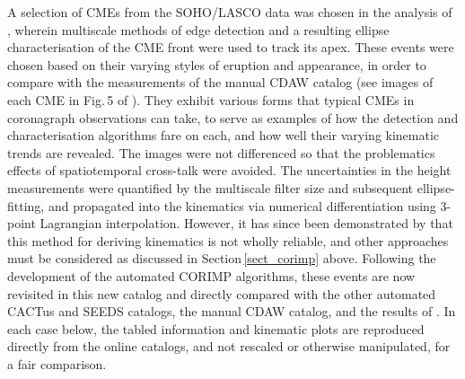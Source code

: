 \documentclass[referee,a4paper,12pt,traditabstract]{swsc}
\begin{document}
A selection of CMEs from the SOHO/LASCO data was chosen in the analysis of \cite{2009A&A...495..325B}, wherein multiscale methods of edge detection and a resulting ellipse characterisation of the CME front were used to track its apex. These events were chosen based on their varying styles of eruption and appearance, in order to compare with the measurements of the manual CDAW catalog (see images of each CME in Fig.\,5 of \citealt{2009A&A...495..325B}). They exhibit various forms that typical CMEs in coronagraph observations can take, to serve as examples of how the detection and characterisation algorithms fare on each, and how well their varying kinematic trends are revealed. The images were not differenced so that the problematics effects of spatiotemporal cross-talk were avoided. The uncertainties in the height measurements were quantified by the multiscale filter size and subsequent ellipse-fitting, and propagated into the kinematics via numerical differentiation using 3-point Lagrangian interpolation. However, it has since been demonstrated by \cite{2013A&A...557A..96B} that this method for deriving kinematics is not wholly reliable, and other approaches must be considered as discussed in Section\,\ref{sect_corimp} above. Following the development of the automated CORIMP algorithms, these events are now revisited in this new catalog and directly compared with the other automated CACTus and SEEDS catalogs, the manual CDAW catalog, and the results of \cite{2009A&A...495..325B}. In each case below, the tabled information and kinematic plots are reproduced directly from the online catalogs, and not rescaled or otherwise manipulated, for a fair comparison.



\end{document}

